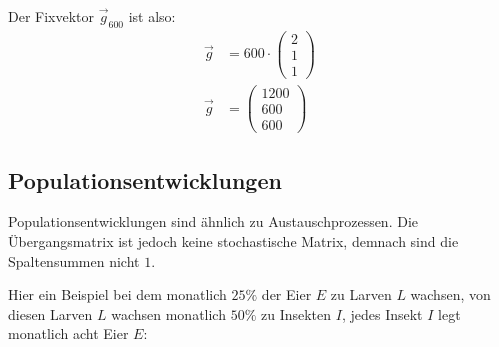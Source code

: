\begin{flushleft}
Der Fixvektor $\vec{g}_{600}$ ist also:
\begin{align}
    \vec{g}&=600\cdot\begin{pmatrix} 2 \\ 1 \\ 1 \end{pmatrix} \\
    \vec{g}&=\begin{pmatrix} 1200 \\ 600 \\ 600 \end{pmatrix}
\end{align}
\end{flushleft}

\subsection{Populationsentwicklungen}
\begin{flushleft}
Populationsentwicklungen sind ähnlich zu Austauschprozessen.
Die Übergangsmatrix ist jedoch keine stochastische Matrix, demnach sind die Spaltensummen nicht $1$.

Hier ein Beispiel bei dem monatlich $25\%$ der Eier $E$ zu Larven $L$ wachsen,
von diesen Larven $L$ wachsen monatlich $50\%$ zu Insekten $I$,
jedes Insekt $I$ legt monatlich acht Eier $E$:
\end{flushleft}

\begin{center}
\end{center}

\begin{center}
\end{center}


